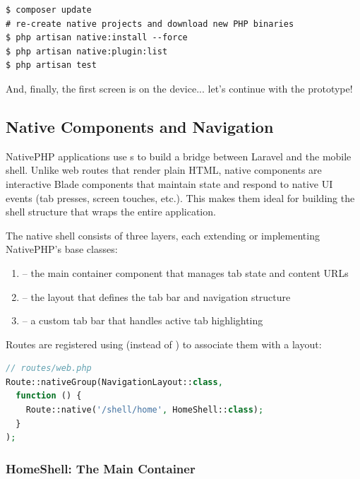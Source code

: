 \begin{lstlisting}[language=terminal]
$ composer update
# re-create native projects and download new PHP binaries
$ php artisan native:install --force
$ php artisan native:plugin:list
$ php artisan test
\end{lstlisting}

\noindent And, finally, the first screen is on the device... let's continue with the prototype!


\subsection{Native Components and Navigation} \label{native-components}

NativePHP applications use s to build a bridge between Laravel and the mobile
shell. Unlike web routes that render plain HTML, native components are interactive Blade
components that maintain state and respond to native UI events (tab presses, screen touches,
etc.). This makes them ideal for building the shell structure that wraps the entire application.

The native shell consists of three layers, each extending or implementing NativePHP's base classes:

\begin{enumerate}
  \item {} -- the main container component that manages tab state and content URLs
  \item {} -- the layout that defines the tab bar and navigation structure
  \item {} -- a custom tab bar that handles active tab highlighting
\end{enumerate}

\noindent Routes are registered using  (instead of ) to
associate them with a layout:

\begin{lstlisting}[language=php]
// routes/web.php
Route::nativeGroup(NavigationLayout::class,
  function () {
    Route::native('/shell/home', HomeShell::class);
  }
);
\end{lstlisting}

\subsubsection{HomeShell: The Main Container}


